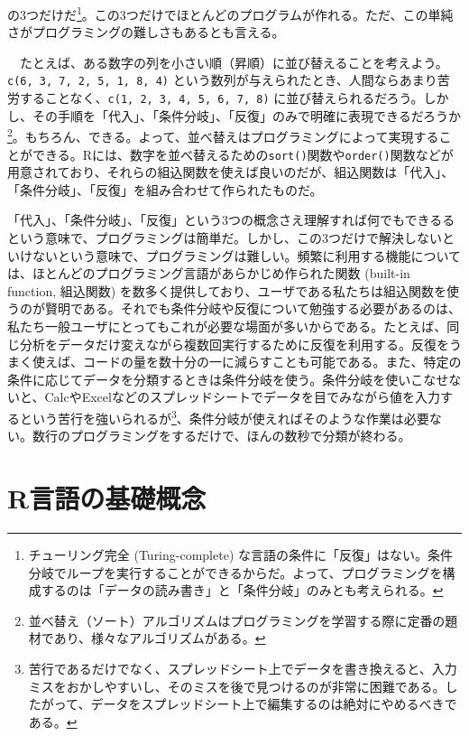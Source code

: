\documentclass[
  a4paper,
  pandoc,
  ja=standard,
  jafont=haranoaji]{bxjsbook}
\begin{document}
の3つだけだ\footnote{チューリング完全 (Turing-complete)
  な言語の条件に「反復」はない。条件分岐でループを実行することができるからだ。よって、プログラミングを構成するのは「データの読み書き」と「条件分岐」のみとも考えられる。}。この3つだけでほとんどのプログラムが作れる。ただ、この単純さがプログラミングの難しさもあるとも言える。

　たとえば、ある数字の列を小さい順（昇順）に並び替えることを考えよう。\texttt{c(6,\ 3,\ 7,\ 2,\ 5,\ 1,\ 8,\ 4)}
という数列が与えられたとき、人間ならあまり苦労することなく、\texttt{c(1,\ 2,\ 3,\ 4,\ 5,\ 6,\ 7,\ 8)}
に並び替えられるだろう。しかし、その手順を「代入」、「条件分岐」、「反復」のみで明確に表現できるだろうか\footnote{並べ替え（ソート）アルゴリズムはプログラミングを学習する際に定番の題材であり、様々なアルゴリズムがある。}。もちろん、できる。よって、並べ替えはプログラミングによって実現することができる。Rには、数字を並べ替えるための\texttt{sort()}関数や\texttt{order()}関数などが用意されており、それらの組込関数を使えば良いのだが、組込関数は「代入」、「条件分岐」、「反復」を組み合わせて作られたものだ。

「代入」、「条件分岐」、「反復」という3つの概念さえ理解すれば何でもできるるという意味で、プログラミングは簡単だ。しかし、この3つだけで解決しないといけないという意味で、プログラミングは難しい。頻繁に利用する機能については、ほとんどのプログラミング言語があらかじめ作られた関数
(built-in function, 組込関数)
を数多く提供しており、ユーザである私たちは組込関数を使うのが賢明である。それでも条件分岐や反復について勉強する必要があるのは、私たち一般ユーザにとってもこれが必要な場面が多いからである。たとえば、同じ分析をデータだけ変えながら複数回実行するために反復を利用する。反復をうまく使えば、コードの量を数十分の一に減らすことも可能である。また、特定の条件に応じてデータを分類するときは条件分岐を使う。条件分岐を使いこなせないと、CalcやExcelなどのスプレッドシートでデータを目でみながら値を入力するという苦行を強いられるが\footnote{苦行であるだけでなく、スプレッドシート上でデータを書き換えると、入力ミスをおかしやすいし、そのミスを後で見つけるのが非常に困難である。したがって、データをスプレッドシート上で編集するのは絶対にやめるべきである。}、条件分岐が使えればそのような作業は必要ない。数行のプログラミングをするだけで、ほんの数秒で分類が終わる。

\hypertarget{sec-programming_intro}{%
\section{R言語の基礎概念}\label{sec-programming_intro}}
\end{document}
